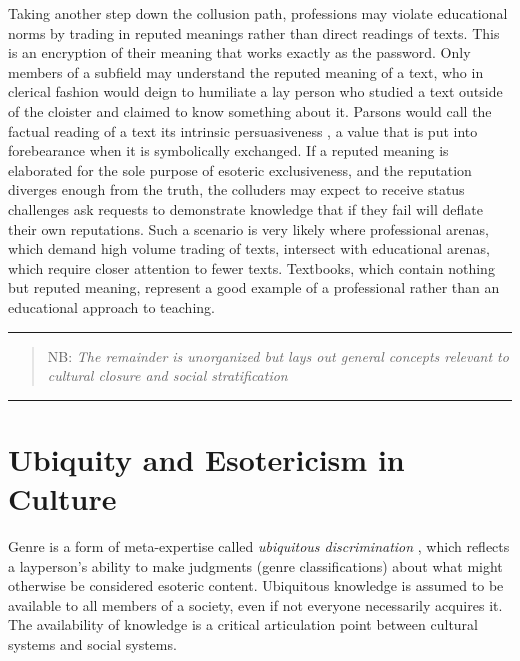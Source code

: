 \documentclass[]{book}
\theoremstyle{definition}
\theoremstyle{definition}
\theoremstyle{definition}
\theoremstyle{remark}
\begin{document}
Taking another step down the collusion path, professions may violate
educational norms by trading in reputed meanings rather than direct
readings of texts. This is an encryption of their meaning that works
exactly as the password. Only members of a subfield may understand the
reputed meaning of a text, who in clerical fashion would deign to
humiliate a lay person who studied a text outside of the cloister and
claimed to know something about it. Parsons would call the factual
reading of a text its intrinsic persuasiveness
\citeyearpar[48]{Parsons1963Concept}, a value that is put into
forebearance when it is symbolically exchanged. If a reputed meaning is
elaborated for the sole purpose of esoteric exclusiveness, and the
reputation diverges enough from the truth, the colluders may expect to
receive status challenges ask requests to demonstrate knowledge that if
they fail will deflate their own reputations. Such a scenario is very
likely where professional arenas, which demand high volume trading of
texts, intersect with educational arenas, which require closer attention
to fewer texts. Textbooks, which contain nothing but reputed meaning,
represent a good example of a professional rather than an educational
approach to teaching.

\begin{center}\rule{0.5\linewidth}{\linethickness}\end{center}

\begin{quote}
NB: \emph{The remainder is unorganized but lays out general concepts
relevant to cultural closure and social stratification}
\end{quote}

\begin{center}\rule{0.5\linewidth}{\linethickness}\end{center}

\hypertarget{ubiquity-and-esotericism-in-culture}{%
\section{Ubiquity and Esotericism in
Culture}\label{ubiquity-and-esotericism-in-culture}}

Genre is a form of meta-expertise called \emph{ubiquitous
discrimination} \citep[45]{Collins2007Rethinking}, which reflects a
layperson's ability to make judgments (genre classifications) about what
might otherwise be considered esoteric content. Ubiquitous knowledge is
assumed to be available to all members of a society, even if not
everyone necessarily acquires it. The availability of knowledge is a
critical articulation point between cultural systems and social systems.
\end{document}
